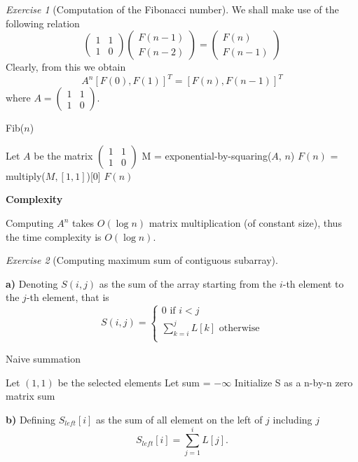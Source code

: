 \documentclass[a4paper,10pt,twoside]{article}
\theoremstyle{plain}
\theoremstyle{definition}
\theoremstyle{remark}
\newtheorem{exercise}{Exercise}
\begin{document}
\begin{exercise}[Computation of the Fibonacci number]
We shall make use of the following relation
\begin{equation}
	\begin{pmatrix}
		1 & 1\\ 1 & 0
	\end{pmatrix}
	\begin{pmatrix}F(n-1)\\F(n-2)\end{pmatrix}
	= \begin{pmatrix}F(n)\\F(n-1)\end{pmatrix}
\end{equation}
Clearly, from this we obtain
\begin{equation}
	A^n [F(0), F(1)]^T = [F(n), F(n-1)]^T
\end{equation}
where $A = \begin{pmatrix}1 & 1\\ 1 & 0\end{pmatrix}$.

\begin{algorithm}[H]
	\caption{Fib($n$)}
	Let $A$ be the matrix $\begin{pmatrix}1 & 1\\ 1 & 0\end{pmatrix}$\;
	M = exponential-by-squaring($A$, $n$)\;
	$F(n)$ = multiply($M,[1, 1]$)[0]\;
	\Return $F(n)$
\end{algorithm}


\textbf{Complexity}

Computing $A^n$ takes $O(\log n)$ matrix multiplication (of constant
size), thus the time complexity is $O(\log n)$.
\end{exercise}
\begin{exercise}[Computing maximum sum of contiguous subarray]\

\textbf{a)} Denoting $S(i, j)$ as the sum of the array starting
from the $i$-th element to the $j$-th element, that is
\[
	S(i, j) = \begin{cases}
		0 \text{ if $i < j$}\\
		\sum_{k=i}^j L[k] \text{ otherwise}\\
	\end{cases}
\]
\begin{algorithm}[H]
	\caption{Naive summation}
	Let $(1, 1)$ be the selected elements\;
	Let sum = $-\infty$ \;
	Initialize S as a n-by-n zero matrix\;
	\Return sum
\end{algorithm}
\textbf{b)} Defining $S_{left}[i]$
as the sum of all element on the left of $j$ including $j$
\[
	S_{left}[i] = \sum_{j=1}^i L[j].
\]
\end{exercise}
\end{document}
